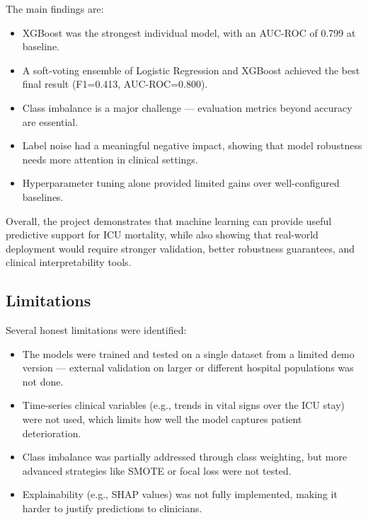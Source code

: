 \documentclass[11pt]{article}
\begin{document}
The main findings are:
\begin{itemize}
    \item \textbf{} XGBoost was the strongest individual model, with an AUC-ROC of 0.799 at baseline.

    \item \textbf{} A soft-voting ensemble of Logistic Regression and XGBoost achieved the best final result (F1=0.413, AUC-ROC=0.800).

    \item \textbf{} Class imbalance is a major challenge — evaluation metrics beyond accuracy are essential.

    \item \textbf{} Label noise had a meaningful negative impact, showing that model robustness needs more attention in clinical settings.

    \item \textbf{} Hyperparameter tuning alone provided limited gains over well-configured baselines.
    
    \end{itemize}
Overall, the project demonstrates that machine learning can provide useful predictive support for ICU mortality, while also showing that real-world deployment would require stronger validation, better robustness guarantees, and clinical interpretability tools.

\subsection{Limitations}
Several honest limitations were identified:
\begin{itemize}
    \item \textbf{} The models were trained and tested on a single dataset from a limited demo version — external validation on larger or different hospital populations was not done.

    \item \textbf{} Time-series clinical variables (e.g., trends in vital signs over the ICU stay) were not used, which limits how well the model captures patient deterioration.

    \item \textbf{} Class imbalance was partially addressed through class weighting, but more advanced strategies like SMOTE or focal loss were not tested.

    \item \textbf{} Explainability (e.g., SHAP values) was not fully implemented, making it harder to justify predictions to clinicians.

    \end{itemize}
\end{document}
